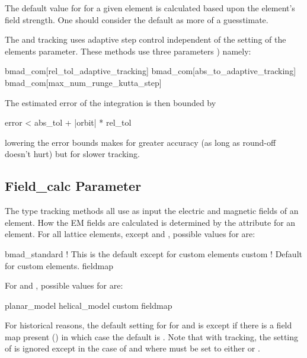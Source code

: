 The default value for  for a given element is calculated based upon the element's field
strength. One should consider the default as more of a guesstimate.

The  and  tracking uses adaptive step control independent of
the setting of the elements  parameter. These methods use three  parameters
) namely:
\begin{example}
  bmad_com[rel_tol_adaptive_tracking]
  bmad_com[abs_to_adaptive_tracking]
  bmad_com[max_num_runge_kutta_step]
\end{example}
The estimated error of the integration is then bounded by
\begin{example}
  error < abs_tol + |orbit| * rel_tol
\end{example}
lowering the error bounds makes for greater accuracy (as long as round-off 
doesn't hurt) but for slower tracking. 

\subsection{Field_calc Parameter}
\label{s:field.calc}

The  type tracking methods all use as input the electric and magnetic fields of
an element. How the EM fields are calculated is determined by the  attribute for an
element.  For all lattice elements, except  and , possible values for
 are:
\begin{example}
  bmad_standard     ! This is the default except for custom elements
  custom            ! Default for custom elements.
  fieldmap
\end{example}
For  and , possible values for  are:
\begin{example}
  planar_model
  helical_model
  custom
  fieldmap
\end{example}
For historical reasons, the default setting for  for  and
 is  except if there is a field map present () in
which case the default is .  Note that with  tracking, the setting of
 is ignored except in the case of  and  where
 must be set to either  or .

